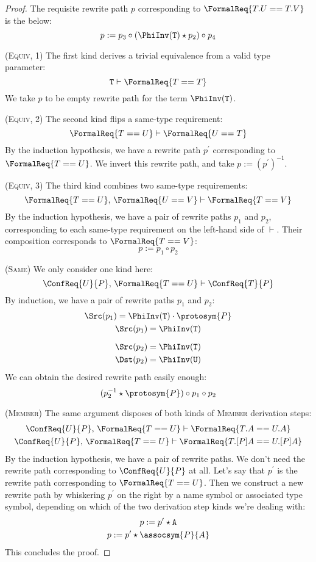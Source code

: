 \documentclass[../generics]{subfiles}
\begin{document}
\begin{proof}
The requisite rewrite path $p$ corresponding to $\FormalReq{T.U == T.V}$ is the below:
\[p := p_3 \circ (\PhiInv(\texttt{T}) \star p_2) \circ p_4\]

(\textsc{Equiv}, 1) The first kind derives a trivial equivalence from a valid type parameter:
\[\texttt{T}\vdash\FormalReq{T == T}\]
We take $p$ to be empty rewrite path for the term $\PhiInv(\texttt{T})$.

(\textsc{Equiv}, 2) The second kind flips a same-type requirement:
\[\FormalReq{T == U}\vdash\FormalReq{U == T}\]
By the induction hypothesis, we have a rewrite path $p^\prime$ corresponding to $\FormalReq{T == U}$. We invert this rewrite path, and take $p := (p^\prime)^{-1}$.

(\textsc{Equiv}, 3) The third kind combines two same-type requirements:
\[\FormalReq{T == U},\,\FormalReq{U == V}\vdash\FormalReq{T == V}\]
By the induction hypothesis, we have a pair of rewrite paths $p_1$ and $p_2$, corresponding to each same-type requirement on the left-hand side of $\vdash$. Their composition corresponds to $\FormalReq{T == V}$:
\[p:=p_1\circ p_2\]

(\textsc{Same}) We only consider one kind here:
\[\ConfReq{U}{P},\,\FormalReq{T == U}\vdash\ConfReq{T}{P}\]
By induction, we have a pair of rewrite paths $p_1$ and $p_2$:
\begin{gather*}
\Src(p_1)=\PhiInv(\texttt{T})\cdot\protosym{P}\\
\Src(p_1)=\PhiInv(\texttt{T})\\[\medskipamount]
\Src(p_2)=\PhiInv(\texttt{T})\\
\Dst(p_2)=\PhiInv(\texttt{U})
\end{gather*}
We can obtain the desired rewrite path easily enough:
\[(p_2^{-1} \star \protosym{P}) \circ p_1 \circ p_2\]

(\textsc{Member}) The same argument disposes of both kinds of \textsc{Member} derivation steps:
\begin{gather*}
\ConfReq{U}{P},\,\FormalReq{T == U}\vdash\FormalReq{T.A == U.A}\\
\ConfReq{U}{P},\,\FormalReq{T == U}\vdash\FormalReq{T.[P]A == U.[P]A}
\end{gather*}
By the induction hypothesis, we have a pair of rewrite paths. We don't need the rewrite path corresponding to $\ConfReq{U}{P}$ at all. Let's say that $p^\prime$ is the rewrite path corresponding to $\FormalReq{T == U}$. Then we construct a new rewrite path by whiskering $p^\prime$ on the right by a name symbol or associated type symbol, depending on which of the two derivation step kinds we're dealing with:
\begin{gather*}
p := p^\prime \star \texttt{A}\\
p := p^\prime \star \assocsym{P}{A}
\end{gather*}
This concludes the proof.
\end{proof}
\end{document}
